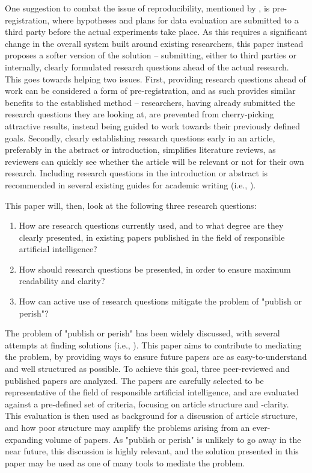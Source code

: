 One suggestion to combat the issue of reproducibility, mentioned by \textcite{Baker_2016}, is pre-registration, where hypotheses and plans for data evaluation are submitted to a third party before the actual experiments take place. As this requires a significant change in the overall system built around existing researchers, this paper instead proposes a softer version of the solution -- submitting, either to third parties or internally, clearly formulated research questions ahead of the actual research. This goes towards helping two issues. First, providing research questions ahead of work can be considered a form of pre-registration, and as such provides similar benefits to the established method -- \mbox{researchers}, having already submitted the research questions they are looking at, are prevented from cherry-picking attractive results, instead being guided to work towards their previously defined goals. Secondly, clearly establishing research questions early in an article, preferably in the abstract or introduction, simplifies literature reviews, as reviewers can quickly see whether the article will be relevant or not for their own research. Including research questions in the introduction or abstract is recommended in several existing guides for academic writing (i.e., \cite{Rosenfeldt_2000,Jha_2014,Lin_2012,Davidson_2012,Cuschieri_2019}).

This paper will, then, look at the following three research questions:
\begin{enumerate}
    \item How are research questions currently used, and to what degree are they clearly presented, in existing papers published in the field of responsible artificial intelligence?
    \item How should research questions be presented, in order to ensure maximum readability and clarity?
    \item How can active use of research questions mitigate the problem of "publish or perish"?
\end{enumerate}

The problem of "publish or perish" has been widely discussed, with several attempts at finding solutions (i.e., \cite{Grimes_2018,Davies_2017,Bornmann_2015}). This paper aims to contribute to mediating the problem, by providing ways to ensure future papers are as easy-to-understand and well structured as possible. To achieve this goal, three peer-reviewed and published papers are analyzed. The papers are carefully selected to be representative of the field of responsible artificial intelligence, and are evaluated against a pre-defined set of criteria, focusing on article structure and -clarity. This evaluation is then used as background for a discussion of article structure, and how poor structure may amplify the problems arising from an ever-expanding volume of papers. As "publish or perish" is unlikely to go away in the near future, this discussion is highly relevant, and the solution presented in this paper may be used as one of many tools to mediate the problem.

